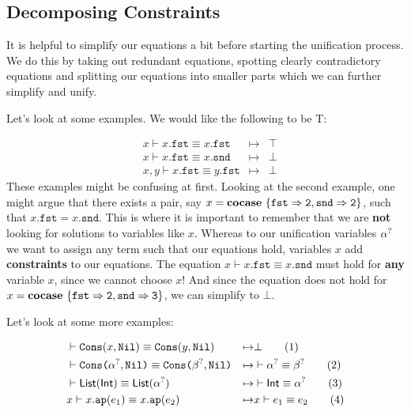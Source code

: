 \documentclass[twoside,12pt,a4paper]{article}
\begin{document}
\subsection{Decomposing Constraints}

It is helpful to simplify our equations a bit before starting the unification process.
We do this by taking out redundant equations, spotting clearly contradictory equations and splitting our equations into smaller parts which we can further simplify and unify.

Let's look at some examples. We would like the following to be T:
\begin{example}
    \begin{align*}
    &x \vdash x.\mathtt{fst} \equiv x.\mathtt{fst} &\mapsto& \top
    \tag{1}\\
    &x \vdash x.\mathtt{fst} \equiv x.\mathtt{snd} &\mapsto& \bot 
    \tag{2}\\
    &x,y \vdash x.\mathtt{fst} \equiv y.\mathtt{fst} &\mapsto& \bot 
    \tag{3}
    \end{align*}
    These examples might be confusing at first. Looking at the second example, one might argue that there exists a pair, say $x = \textbf{cocase}\ \{\mathtt{fst\Rightarrow 2, snd\Rightarrow 2}\}$, such that
    $x.\mathtt{fst} = x.\mathtt{snd}$. This is where it is important to remember that we are \textbf{not} looking for solutions to variables like $x$.
    Whereas to our unification variables $\alpha^?$ we want to assign any term such that our equations hold, variables $x$ add \textbf{constraints} to our equations. 
    The equation $x \vdash x.\mathtt{fst} \equiv x.\mathtt{snd}$ must hold for \textbf{any} variable $x$, since we cannot choose $x$! 
    And since the equation does not hold for $x = \textbf{cocase}\ \{\mathtt{fst\Rightarrow 2, snd\Rightarrow 3}\}$, we can simplify to $\bot$.
\end{example}

Let's look at some more examples:
\begin{example}
    \begin{align*}
    &\vdash \mathtt{Cons(}x, \mathtt{Nil}\mathtt{)} \equiv \mathtt{Cons(}y, \mathtt{Nil}\mathtt{)}&\mapsto& \bot
    \tag{1}\\
    &\vdash \texttt{Cons(}\alpha^?, \texttt{Nil)}\equiv\texttt{Cons(}\beta^?, \texttt{Nil)}
    &\mapsto&\vdash \alpha^?\equiv \beta^?
    \tag{2}\\
    &\vdash \mathsf{List(Int)}\equiv \mathsf{List(\alpha^?)}
    &\mapsto& \vdash \mathsf{Int}\equiv \alpha^?
    \tag{3}\\
    &x \vdash x.\texttt{ap}(e_1)\equiv x.\texttt{ap}(e_2) &\mapsto& x\vdash e_1\equiv e_2 
    \tag{4}
    \end{align*}
\end{example}
\end{document}
